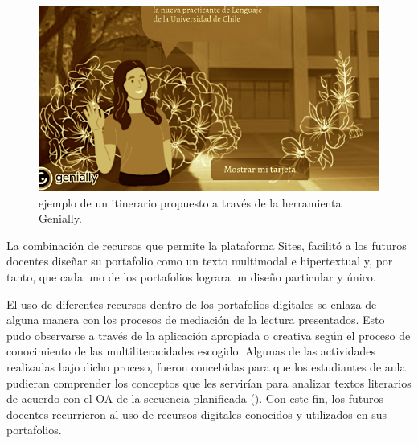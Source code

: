 \begin{figure}[htpb]
\centering
\begin{minipage}{.7\textwidth}
\caption{ejemplo de un itinerario propuesto a través de la herramienta Genially.}
\label{fig-03}
\includegraphics[width=\textwidth]{fig3}
\end{minipage}
\end{figure}


La combinación de recursos que permite la plataforma Sites, facilitó a
los futuros docentes diseñar su portafolio como un texto multimodal e
hipertextual y, por tanto, que cada uno de los portafolios lograra un
diseño particular y único.

El uso de diferentes recursos dentro de los portafolios digitales se
enlaza de alguna manera con los procesos de mediación de la lectura
presentados. Esto pudo observarse a través de la aplicación apropiada o
creativa según el proceso de conocimiento de las multiliteracidades
escogido. Algunas de las actividades realizadas bajo dicho proceso,
fueron concebidas para que los estudiantes de aula pudieran comprender
los conceptos que les servirían para analizar textos literarios de
acuerdo con el OA de la secuencia planificada (). Con este fin,
los futuros docentes recurrieron al uso de recursos digitales conocidos
y utilizados en sus portafolios.

